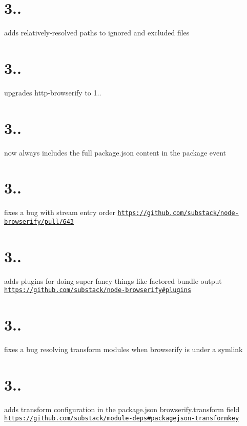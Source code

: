 \section*{3..}

adds relatively-\/resolved paths to ignored and excluded files

\section*{3..}

upgrades http-\/browserify to 1..

\section*{3..}

now always includes the full package.\+json content in the \textquotesingle{}package\textquotesingle{} event

\section*{3..}

fixes a bug with stream entry order \href{https://github.com/substack/node-browserify/pull/643}{\tt https\+://github.\+com/substack/node-\/browserify/pull/643}

\section*{3..}

adds plugins for doing super fancy things like factored bundle output \href{https://github.com/substack/node-browserify#plugins}{\tt https\+://github.\+com/substack/node-\/browserify\#plugins}

\section*{3..}

fixes a bug resolving transform modules when browserify is under a symlink

\section*{3..}

adds transform configuration in the package.\+json browserify.\+transform field \href{https://github.com/substack/module-deps#packagejson-transformkey}{\tt https\+://github.\+com/substack/module-\/deps\#packagejson-\/transformkey}

